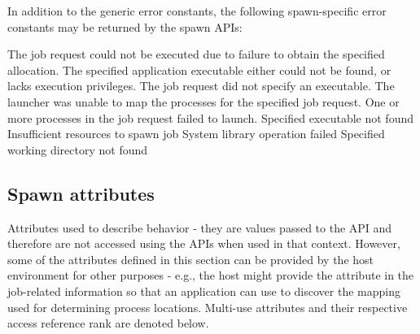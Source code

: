 In addition to the generic error constants, the following spawn-specific error constants may be returned by the spawn \acp{API}:

\begin{constantdesc}
%
The job request could not be executed due to failure to obtain the specified allocation.
%
The specified application executable either could not be found, or lacks execution privileges.
%
The job request did not specify an executable.
%
The launcher was unable to map the processes for the specified job request.
%
One or more processes in the job request failed to launch.
%
Specified executable not found
%
Insufficient resources to spawn job
%
System library operation failed
%
Specified working directory not found
%
\end{constantdesc}

\subsection{Spawn attributes}
\label{api:struct:attributes:spawn}

Attributes used to describe  behavior - they are values passed to the  \ac{API} and therefore are not accessed using the  \acp{API} when used in that context. However, some of the attributes defined in this section can be provided by the host environment for other purposes - e.g., the host might provide the  attribute in the job-related information so that an application can use  to discover the mapping used for determining process locations. Multi-use attributes and their respective access reference rank are denoted below.

